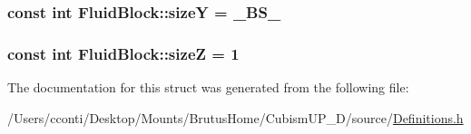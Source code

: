 \subsubsection[{size\+Y}]{\setlength{\rightskip}{0pt plus 5cm}const int Fluid\+Block\+::size\+Y = {\bf \+\_\+\+B\+S\+\_\+}\hspace{0.3cm}{\ttfamily [static]}}\label{struct_fluid_block_afd21ed464f6732be798bba7d87113bd2}
\hypertarget{struct_fluid_block_a7876602d8791ed7d4734fa20ad0a9574}{}
\subsubsection[{size\+Z}]{\setlength{\rightskip}{0pt plus 5cm}const int Fluid\+Block\+::size\+Z = 1\hspace{0.3cm}{\ttfamily [static]}}\label{struct_fluid_block_a7876602d8791ed7d4734fa20ad0a9574}


The documentation for this struct was generated from the following file\+:\begin{DoxyCompactItemize}
\item 
/\+Users/cconti/\+Desktop/\+Mounts/\+Brutus\+Home/\+Cubism\+U\+P\+\_\+D/source/\hyperlink{_definitions_8h}{Definitions.\+h}\end{DoxyCompactItemize}
